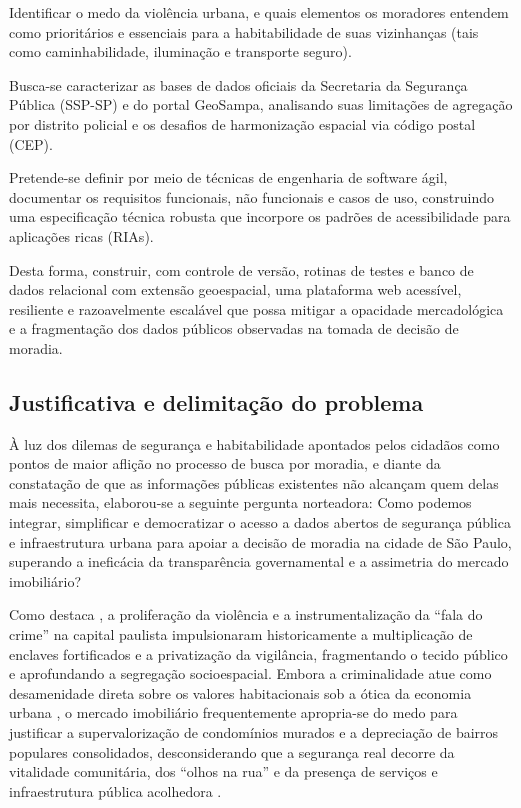 \documentclass[
    12pt,
    oneside,            %
    a4paper,
    brazilian
    ]{abntex2}
\begin{document}
Identificar o medo da violência urbana, e quais elementos os moradores entendem como prioritários e essenciais para a habitabilidade de suas vizinhanças (tais como caminhabilidade, iluminação e transporte seguro).

Busca-se caracterizar as bases de dados oficiais da Secretaria da Segurança Pública (SSP-SP) e do portal GeoSampa, analisando suas limitações de agregação por distrito policial e os desafios de harmonização espacial via código postal (CEP).

Pretende-se definir por meio de técnicas de engenharia de software ágil, documentar os requisitos funcionais, não funcionais e casos de uso, construindo uma especificação técnica robusta que incorpore os padrões de acessibilidade para aplicações ricas (RIAs).

Desta forma, construir, com controle de versão, rotinas de testes e banco de dados relacional com extensão geoespacial, uma plataforma web acessível, resiliente e razoavelmente escalável que possa mitigar a opacidade mercadológica e a fragmentação dos dados públicos observadas na tomada de decisão de moradia.

\hfill

\subsection{Justificativa e delimitação do problema}

À luz dos dilemas de segurança e habitabilidade apontados pelos cidadãos como pontos de maior aflição no processo de busca por moradia, e diante da constatação de que as informações públicas existentes não alcançam quem delas mais necessita, elaborou-se a seguinte pergunta norteadora: Como podemos integrar, simplificar e democratizar o acesso a dados abertos de segurança pública e infraestrutura urbana para apoiar a decisão de moradia na cidade de São Paulo, superando a ineficácia da transparência governamental e a assimetria do mercado imobiliário?

Como destaca , a proliferação da violência e a instrumentalização da ``fala do crime'' na capital paulista impulsionaram historicamente a multiplicação de enclaves fortificados e a privatização da vigilância, fragmentando o tecido público e aprofundando a segregação socioespacial. Embora a criminalidade atue como desamenidade direta sobre os valores habitacionais sob a ótica da economia urbana \cite{teixeira2016}, o mercado imobiliário frequentemente apropria-se do medo para justificar a supervalorização de condomínios murados e a depreciação de bairros populares consolidados, desconsiderando que a segurança real decorre da vitalidade comunitária, dos ``olhos na rua'' e da presença de serviços e infraestrutura pública acolhedora \cite[cap.~1]{jacobs2011}.
\end{document}
